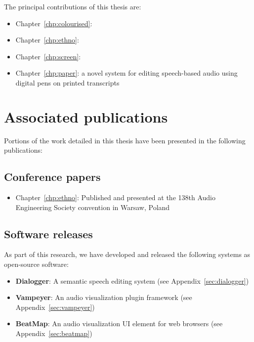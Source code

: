 The principal contributions of this thesis are:
\begin{itemize}
  \item Chapter~\ref{chp:colourised}: 
  \item Chapter~\ref{chp:ethno}: 
  \item Chapter~\ref{chp:screen}: 
  \item Chapter~\ref{chp:paper}: a novel system for editing speech-based audio using digital pens on printed transcripts
\end{itemize}

\section{Associated publications}\label{sec:intro-publications}

Portions of the work detailed in this thesis have been presented in the following publications:

\subsection*{Conference papers}

\begin{itemize}
  \item Chapter~\ref{chp:ethno}: Published and presented at the 138th Audio Engineering Society convention in Warsaw,
    Poland \citep{Baume2015}
\end{itemize}

\subsection*{Software releases}
As part of this research, we have developed and released the following systems as open-source software:

\begin{itemize}
  \item \textbf{Dialogger}: A semantic speech editing system (see Appendix~\ref{sec:dialogger})
  \item \textbf{Vampeyer}: An audio visualization plugin framework (see Appendix~\ref{sec:vampeyer})
  \item \textbf{BeatMap}: An audio visualization UI element for web browsers (see Appendix~\ref{sec:beatmap})
\end{itemize}


